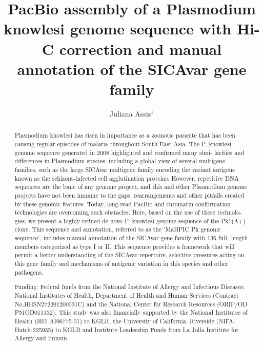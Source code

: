 \documentclass[twoside]{article}
\title{\vspace{-15mm}\fontsize{24pt}{10pt}\selectfont\textbf{PacBio assembly of a Plasmodium knowlesi genome sequence with Hi-C correction and manual annotation of the SICAvar gene family}} %
\author{Juliana Assis$^1$}
\affil{1 UFMG\\ }
\date{}
\begin{document}
\maketitle %

\thispagestyle{fancy} %


\begin{abstract}
Plasmodium knowlesi has risen in importance as a zoonotic parasite that has been causing regular episodes of malaria throughout South East Asia. The P. knowlesi genome sequence generated in 2008 highlighted and confirmed many simi- larities and differences in Plasmodium species, including a global view of several multigene families, such as the large SICAvar multigene family encoding the variant antigens known as the schizont-infected cell agglutination proteins. However, repetitive DNA sequences are the bane of any genome project, and this and other Plasmodium genome projects have not been immune to the gaps, rearrangements and other pitfalls created by these genomic features. Today, long-read PacBio and chromatin conformation technologies are overcoming such obstacles. Here, based on the use of these technolo- gies, we present a highly refined de novo P. knowlesi genome sequence of the Pk1(A+) clone. This sequence and annotation, referred to as the 'MaHPIC Pk genome sequence', includes manual annotation of the SICAvar gene family with 136 full- length members categorized as type I or II. This sequence provides a framework that will permit a better understanding of the SICAvar repertoire, selective pressures acting on this gene family and mechanisms of antigenic variation in this species and other pathogens.

Funding: Federal funds from the National Institute of Allergy and Infectious Diseases; National Institutes of Health, Department of Health and Human Services (Contract No.HHSN272201200031C) and the National Center for Research Resources (ORIP/OD P51OD011132). This study was also financially supported by the National Institutes of Health (R01 AI06775-01) to KGLR, the University of California, Riverside (NIFA-Hatch-225935) to KGLR and Institute Leadership Funds from La Jolla Institute for Allergy and Immun
\end{abstract}
\end{document}
